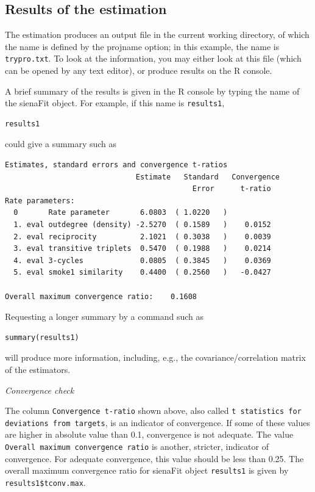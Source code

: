 \documentclass[a4paper,fleqn,11pt]{article}
\newcommand{\+}{\, + \,}
\newcommand{\sfn}[1]{\textsf{#1}}
\newcommand{\R}{{\sf R }}
\begin{document}
\subsection{Results of the estimation}

The estimation produces an output file in the current working directory,
of which the name is defined by the \textsf{projname} option;
in this example, the name is \texttt{trypro.txt}.
To look at the information, you may either look at this file
(which can be opened by any text editor), or produce results on the \R console.

A brief summary of the results is given in the \R console by
typing the name of the  \sfn{sienaFit} object. For example,
if this name is \texttt{results1},
\begin{verbatim}
results1
\end{verbatim}
could give a summary such as
\par
{\footnotesize
\begin{verbatim}
Estimates, standard errors and convergence t-ratios
                              Estimate   Standard   Convergence
                                           Error      t-ratio
Rate parameters:
  0       Rate parameter       6.0803  ( 1.0220   )
  1. eval outdegree (density) -2.5270  ( 0.1589   )    0.0152
  2. eval reciprocity          2.1021  ( 0.3038   )    0.0039
  3. eval transitive triplets  0.5470  ( 0.1988   )    0.0214
  4. eval 3-cycles             0.0805  ( 0.3845   )    0.0369
  5. eval smoke1 similarity    0.4400  ( 0.2560   )   -0.0427

Overall maximum convergence ratio:    0.1608
\end{verbatim}
}
Requesting a longer summary by a command such as
\begin{verbatim}
summary(results1)
\end{verbatim}
will produce more information, including, e.g.,
the covariance/correlation matrix of the estimators.
\bigskip

\emph{Convergence check}
\smallskip

\noindent
The column \texttt{\small Convergence t-ratio} shown above, also
called \texttt{\small t statistics for deviations from targets},
is an indicator of convergence. If some of these values
are higher in absolute value than 0.1, convergence is not adequate.
The value \texttt{Overall maximum convergence ratio} is another, stricter,
indicator of convergence.
For adequate convergence, this value should be less than 0.25.
The overall maximum convergence ratio for \sfn{sienaFit} object \texttt{results1}
is given by  \texttt{results1\$tconv.max}.
\end{document}

